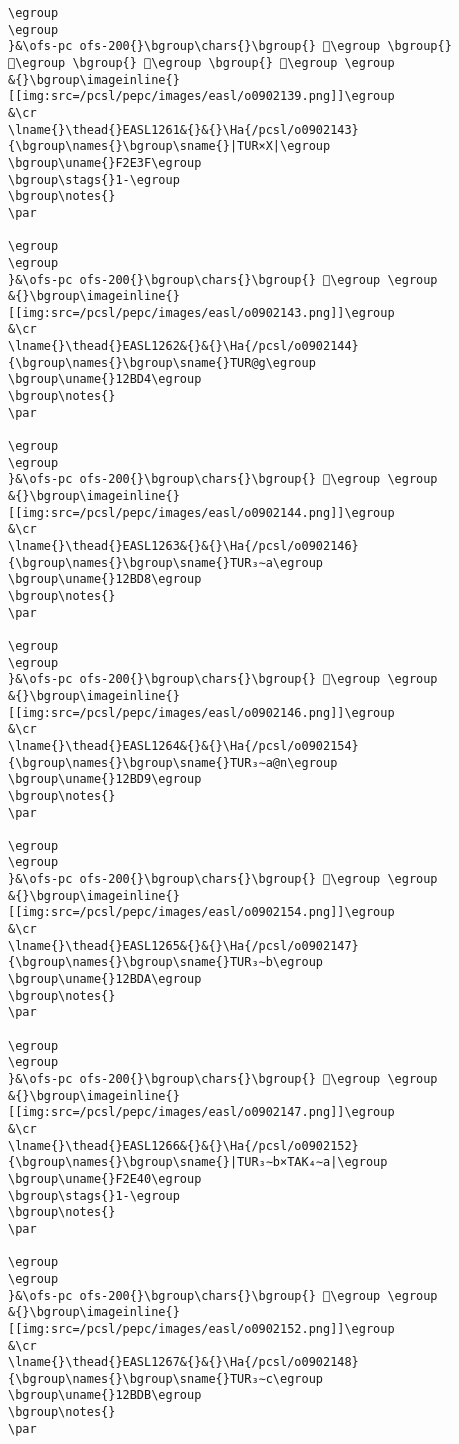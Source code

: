 \begin{verbatim}
\egroup
\egroup
}&\ofs-pc ofs-200{}\bgroup\chars{}\bgroup{} 𒯓\egroup \bgroup{} 𒯕\egroup \bgroup{} 𒯖\egroup \bgroup{} 𒯗\egroup \egroup
&{}\bgroup\imageinline{}[[img:src=/pcsl/pepc/images/easl/o0902139.png]]\egroup
&\cr
\lname{}\thead{}EASL1261&{}&{}\Ha{/pcsl/o0902143}{\bgroup\names{}\bgroup\sname{}|TUR×X|\egroup
\bgroup\uname{}F2E3F\egroup
\bgroup\stags{}1-\egroup
\bgroup\notes{}
\par 

\egroup
\egroup
}&\ofs-pc ofs-200{}\bgroup\chars{}\bgroup{} 󲸿\egroup \egroup
&{}\bgroup\imageinline{}[[img:src=/pcsl/pepc/images/easl/o0902143.png]]\egroup
&\cr
\lname{}\thead{}EASL1262&{}&{}\Ha{/pcsl/o0902144}{\bgroup\names{}\bgroup\sname{}TUR@g\egroup
\bgroup\uname{}12BD4\egroup
\bgroup\notes{}
\par 

\egroup
\egroup
}&\ofs-pc ofs-200{}\bgroup\chars{}\bgroup{} 𒯔\egroup \egroup
&{}\bgroup\imageinline{}[[img:src=/pcsl/pepc/images/easl/o0902144.png]]\egroup
&\cr
\lname{}\thead{}EASL1263&{}&{}\Ha{/pcsl/o0902146}{\bgroup\names{}\bgroup\sname{}TUR₃∼a\egroup
\bgroup\uname{}12BD8\egroup
\bgroup\notes{}
\par 

\egroup
\egroup
}&\ofs-pc ofs-200{}\bgroup\chars{}\bgroup{} 𒯘\egroup \egroup
&{}\bgroup\imageinline{}[[img:src=/pcsl/pepc/images/easl/o0902146.png]]\egroup
&\cr
\lname{}\thead{}EASL1264&{}&{}\Ha{/pcsl/o0902154}{\bgroup\names{}\bgroup\sname{}TUR₃∼a@n\egroup
\bgroup\uname{}12BD9\egroup
\bgroup\notes{}
\par 

\egroup
\egroup
}&\ofs-pc ofs-200{}\bgroup\chars{}\bgroup{} 𒯙\egroup \egroup
&{}\bgroup\imageinline{}[[img:src=/pcsl/pepc/images/easl/o0902154.png]]\egroup
&\cr
\lname{}\thead{}EASL1265&{}&{}\Ha{/pcsl/o0902147}{\bgroup\names{}\bgroup\sname{}TUR₃∼b\egroup
\bgroup\uname{}12BDA\egroup
\bgroup\notes{}
\par 

\egroup
\egroup
}&\ofs-pc ofs-200{}\bgroup\chars{}\bgroup{} 𒯚\egroup \egroup
&{}\bgroup\imageinline{}[[img:src=/pcsl/pepc/images/easl/o0902147.png]]\egroup
&\cr
\lname{}\thead{}EASL1266&{}&{}\Ha{/pcsl/o0902152}{\bgroup\names{}\bgroup\sname{}|TUR₃∼b×TAK₄∼a|\egroup
\bgroup\uname{}F2E40\egroup
\bgroup\stags{}1-\egroup
\bgroup\notes{}
\par 

\egroup
\egroup
}&\ofs-pc ofs-200{}\bgroup\chars{}\bgroup{} 󲹀\egroup \egroup
&{}\bgroup\imageinline{}[[img:src=/pcsl/pepc/images/easl/o0902152.png]]\egroup
&\cr
\lname{}\thead{}EASL1267&{}&{}\Ha{/pcsl/o0902148}{\bgroup\names{}\bgroup\sname{}TUR₃∼c\egroup
\bgroup\uname{}12BDB\egroup
\bgroup\notes{}
\par 


\end{verbatim}
